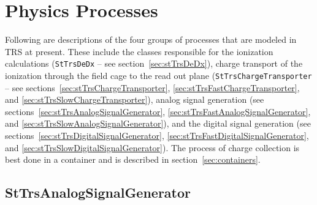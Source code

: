 \documentclass[twoside]{article}
\newcommand{\name}[1]{\textsf{#1}}%
\newcommand{\comp}[1]{\texttt{#1}}%
\begin{document}
\section{Physics Processes}
\label{sec:physicsprocesses}

Following are descriptions of the four groups of processes
that are modeled in \name{TRS} at present.  These include the classes
responsible for the ionization calculations 
(\comp{StTrsDeDx} -- see section~\ref{sec:stTrsDeDx}), charge transport
of the ionization through the field cage to the read out plane
(\comp{StTrsChargeTransporter} -- see 
sections~\ref{sec:stTrsChargeTransporter}, 
\ref{sec:stTrsFastChargeTransporter}, and
\ref{sec:stTrsSlowChargeTransporter}), analog signal generation
(see sections~\ref{sec:stTrsAnalogSignalGenerator},
\ref{sec:stTrsFastAnalogSignalGenerator}, and 
\ref{sec:stTrsSlowAnalogSignalGenerator}), and the digital
signal generation (see sections~\ref{sec:stTrsDigitalSignalGenerator},
\ref{sec:stTrsFastDigitalSignalGenerator}, and 
\ref{sec:stTrsSlowDigitalSignalGenerator}).  The process of charge
collection is best done in a container and is described in
section~\ref{sec:containers}.

%
%
\subsection{StTrsAnalogSignalGenerator} 
\label{sec:stTrsAnalogSignalGenerator}
\end{document}
